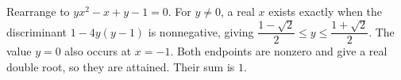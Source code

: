 Rearrange to $ yx^2-x+y-1=0 $. For $ y\ne0 $, a real $ x $ exists exactly when the discriminant $ 1-4y(y-1)$ is nonnegative, giving $\dfrac{1-\sqrt2}{2}\le y\le\dfrac{1+\sqrt2}{2}$. The value $ y=0 $ also occurs at $ x=-1 $. Both endpoints are nonzero and give a real double root, so they are attained. Their sum is $\boxed1 $.
